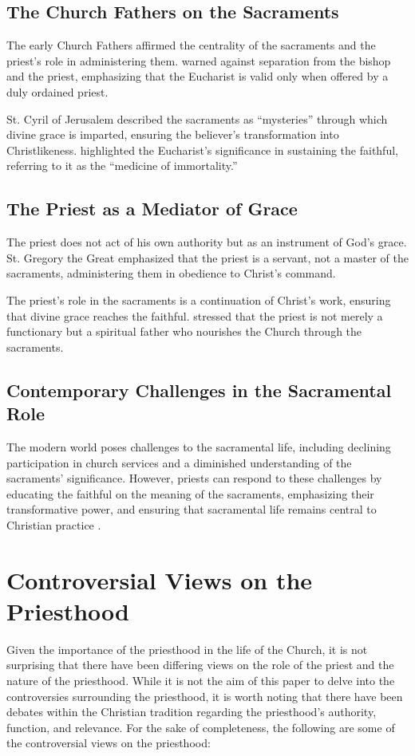 \documentclass[12pt, doc]{apa7}   	%
\begin{document}
\subsection{The Church Fathers on the Sacraments}

The early Church Fathers affirmed the centrality of the sacraments and the priest’s role in administering them. \cite{epistles_ignatius} warned against separation from the bishop and the priest, emphasizing that the Eucharist is valid only when offered by a duly ordained priest. 

St. Cyril of Jerusalem \citep{early_church_akin} described the sacraments as ``mysteries'' through which divine grace is imparted, ensuring the believer’s transformation into Christlikeness. \citet{priesthood_chrysostom,complete_work_chrysostom} highlighted the Eucharist’s significance in sustaining the faithful, referring to it as the ``medicine of immortality.''

\subsection{The Priest as a Mediator of Grace}

The priest does not act of his own authority but as an instrument of God’s grace. St. Gregory the Great \citep{early_church_akin} emphasized that the priest is a servant, not a master of the sacraments, administering them in obedience to Christ’s command.

The priest’s role in the sacraments is a continuation of Christ’s work, ensuring that divine grace reaches the faithful. \citet{priesthood_shenouda} stressed that the priest is not merely a functionary but a spiritual father who nourishes the Church through the sacraments.

\subsection{Contemporary Challenges in the Sacramental Role}

The modern world poses challenges to the sacramental life, including declining participation in church services and a diminished understanding of the sacraments’ significance. However, priests can respond to these challenges by educating the faithful on the meaning of the sacraments, emphasizing their transformative power, and ensuring that sacramental life remains central to Christian practice \citep{eucharist_schmemann}.

\section{Controversial Views on the Priesthood}
Given the importance of the priesthood in the life of the Church, it is not surprising that there have been differing views on the role of the priest and the nature of the priesthood. While it is not the aim of this paper to delve into the controversies surrounding the priesthood, it is worth noting that there have been debates within the Christian tradition regarding the priesthood’s authority, function, and relevance.  For the sake of completeness, the following are some of the controversial views on the priesthood:
\end{document}
